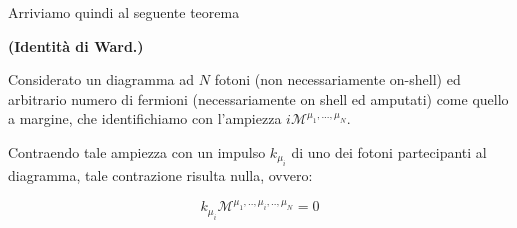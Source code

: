 \documentclass[../main.tex]{subfiles}
\begin{document}
Arriviamo quindi al seguente teorema
\begin{theorem}
    \textbf{(Identità di Ward.)}

    Considerato un diagramma ad $N$ fotoni (non necessariamente on-shell) ed arbitrario numero di fermioni (necessariamente on shell ed amputati) come quello a margine, che identifichiamo con l'ampiezza \(i\mathcal{M}^{\mu_1,...,\mu_N}\).

    Contraendo tale ampiezza con un impulso $k_{\mu_i}$ di uno dei fotoni partecipanti al diagramma, tale contrazione risulta nulla, ovvero:
    
    \begin{equation}
        \boxed{k_{\mu_i}\mathcal{M}^{\mu_1,..,\mu_i,..,\mu_N} = 0}
        \label{eq:ward_id_formal}
    \end{equation}
    \label{th:Ward_identity}
\end{theorem}
\end{document}
